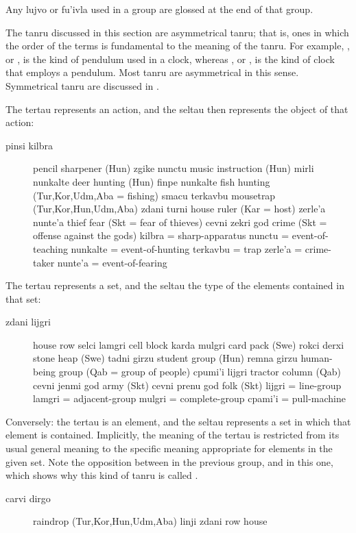 Any lujvo or fu'ivla used in a group are glossed at the end
    of that group.

The tanru discussed in this section are asymmetrical tanru;
    that is, ones in which the order of the terms is fundamental to
    the meaning of the tanru. For example, , or
    , is the kind of pendulum used in a clock,
    whereas , or , is the kind
    of clock that employs a pendulum. Most tanru are asymmetrical
    in this sense. Symmetrical tanru are discussed in .

The tertau represents an action, and the seltau then
    represents the object of that action:
\begin{description}
\item[pinsi kilbra] pencil sharpener (Hun) zgike nunctu music instruction (Hun) mirli nunkalte deer hunting (Hun) finpe nunkalte fish hunting (Tur,Kor,Udm,Aba = fishing) smacu terkavbu mousetrap (Tur,Kor,Hun,Udm,Aba) zdani turni house ruler (Kar = host) zerle'a nunte'a thief fear (Skt = fear of thieves) cevni zekri god crime (Skt = offense against the gods) kilbra = sharp-apparatus nunctu = event-of-teaching nunkalte = event-of-hunting terkavbu = trap zerle'a = crime-taker nunte'a = event-of-fearing
\end{description}

The tertau represents a set, and the seltau the type of the
    elements contained in that set: 
\begin{description}
\item[zdani lijgri] house row selci lamgri cell block karda mulgri card pack (Swe) rokci derxi stone heap (Swe) tadni girzu student group (Hun) remna girzu human-being group (Qab = group of people) cpumi'i lijgri tractor column (Qab) cevni jenmi god army (Skt) cevni prenu god folk (Skt) lijgri = line-group lamgri = adjacent-group mulgri = complete-group cpami'i = pull-machine
\end{description}

Conversely: the tertau is an element, and the seltau represents
    a set in which that element is contained. Implicitly, the
    meaning of the tertau is restricted from its usual general
    meaning to the specific meaning appropriate for elements in the
    given set. Note the opposition between  in the
    previous group, and  in this one, which shows
    why this kind of tanru is called . 
\begin{description}
\item[carvi dirgo] raindrop (Tur,Kor,Hun,Udm,Aba) linji zdani row house
\end{description}

